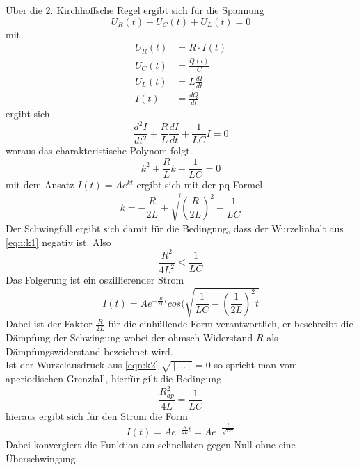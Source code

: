 Über die 2. Kirchhoffsche Regel ergibt sich für die Spannung
\begin{equation}
    U_R(t)+U_C(t)+U_L(t)=0
\end{equation}
mit
\begin{align*}
    U_R(t)&=R \cdot I(t)\\
    U_C(t)&=\frac{Q(t)}{C}\\
    U_L(t)&=L\frac{dI}{dt}\\
    I(t)&=\frac{dQ}{dt}
\end{align*}
ergibt sich
\begin{equation}
    \frac{d^2I}{dt^2}+\frac{R}{L}\frac{dI}{dt}+\frac{1}{LC}I=0
\end{equation}
woraus das charakteristische Polynom folgt.
\begin{equation}
    k^2+\frac{R}{L}k+\frac{1}{LC}=0
\end{equation}
mit dem Ansatz $I(t)=Ae^{kt}$ ergibt sich mit der pq-Formel
\begin{equation}
    k=-\frac{R}{2L} \pm \sqrt{(\frac{R}{2L})^2-\frac{1}{LC}}                          %
    \label{eqn:k1}
\end{equation}
Der Schwingfall ergibt sich damit für die Bedingung, dass der Wurzelinhalt 
aus \ref{eqn:k1} negativ ist. Also
\begin{equation}
    \frac{R^2}{4L^2}<\frac{1}{LC}
    \label{eqn:k2}
\end{equation}
Das Folgerung ist ein oszillierender Strom
\begin{equation}
    I(t)=Ae^{-\frac{R}{2L}t}cos(\sqrt{\frac{1}{LC}-(\frac{1}{2L})^2t}
\end{equation} 
Dabei ist der Faktor $\frac{R}{2L}$ für die einhüllende Form verantwortlich,
er beschreibt die Dämpfung der Schwingung wobei der ohmsch Widerstand $R$ als 
Dämpfungswiderstand bezeichnet wird.\\

Ist der Wurzelausdruck aus \ref{eqn:k2} $\sqrt{[...]}=0$
so spricht man vom aperiodischen Grenzfall, hierfür gilt die Bedingung
\begin{equation}
    \frac{R_{ap}^2}{4L}=\frac{1}{LC}
\end{equation}
hieraus ergibt sich für den Strom die Form
\begin{equation}
    I(t)=Ae^{-\frac{R}{2L}t}=Ae^{-\frac{t}{\sqrt{LC}}}
    \label{eqn:efunktion}
\end{equation}
Dabei konvergiert die Funktion am schnellsten gegen Null ohne eine Überschwingung.\\\\

